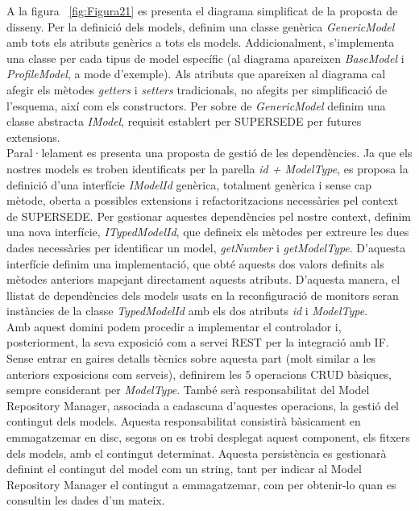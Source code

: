 A la figura ~\ref{fig:Figura21} es presenta el diagrama simplificat de la proposta de disseny. Per la definició dels models, definim una classe genèrica \textit{GenericModel} amb tots els atributs genèrics a tots els models. Addicionalment, s'implementa una classe per cada tipus de model específic (al diagrama apareixen \textit{BaseModel} i \textit{ProfileModel}, a mode d'exemple). Als atributs que apareixen al diagrama cal afegir els mètodes \textit{getters} i \textit{setters} tradicionals, no afegits per simplificació de l'esquema, així com els constructors. Per sobre de \textit{GenericModel} definim una classe abstracta \textit{IModel}, requisit establert per SUPERSEDE per futures extensions. \\

Paral·lelament es presenta una proposta de gestió de les dependències. Ja que els nostres models es troben identificats per la parella \textit{id + ModelType}, es proposa la definició d'una interfície \textit{IModelId} genèrica, totalment genèrica i sense cap mètode, oberta a possibles extensions i refactoritzacions necessàries pel context de SUPERSEDE. Per gestionar aquestes dependències pel nostre context, definim una nova interfície, \textit{ITypedModelId}, que defineix els mètodes per extreure les dues dades necessàries per identificar un model, \textit{getNumber} i \textit{getModelType}. D'aquesta interfície definim una implementació, que obté aquests dos valors definits als mètodes anteriors mapejant directament aquests atributs. D'aquesta manera, el llistat de dependències dels models usats en la reconfiguració de monitors seran instàncies de la classe \textit{TypedModelId} amb els dos atributs \textit{id} i \textit{ModelType}.\\ 

Amb aquest domini podem procedir a implementar el controlador i, posteriorment, la seva exposició com a servei REST per la integració amb IF. Sense entrar en gaires detalls tècnics sobre aquesta part (molt similar a les anteriors exposicions com serveis), definirem les 5 operacions CRUD bàsiques, sempre considerant per \textit{ModelType}. També serà responsabilitat del Model Repository Manager, associada a cadascuna d'aquestes operacions, la gestió del contingut dels models. Aquesta responsabilitat consistirà bàsicament en emmagatzemar en disc, segons on es trobi desplegat aquest component, els fitxers dels models, amb el contingut determinat. Aquesta persistència es gestionarà definint el contingut del model com un string, tant per indicar al Model Repository Manager el contingut a emmagatzemar, com per obtenir-lo quan es consultin les dades d'un mateix.

